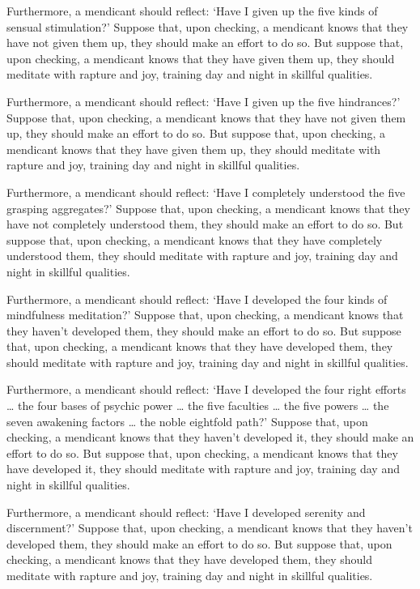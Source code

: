 \documentclass[12pt,openany]{book}%
\begin{document}
Furthermore, a mendicant should reflect: ‘Have I given up the five kinds of sensual stimulation?’ Suppose that, upon checking, a mendicant knows that they have not given them up, they should make an effort to do so. But suppose that, upon checking, a mendicant knows that they have given them up, they should meditate with rapture and joy, training day and night in skillful qualities. 

Furthermore, a mendicant should reflect: ‘Have I given up the five hindrances?’ Suppose that, upon checking, a mendicant knows that they have not given them up, they should make an effort to do so. But suppose that, upon checking, a mendicant knows that they have given them up, they should meditate with rapture and joy, training day and night in skillful qualities. 

Furthermore, a mendicant should reflect: ‘Have I completely understood the five grasping aggregates?’ Suppose that, upon checking, a mendicant knows that they have not completely understood them, they should make an effort to do so. But suppose that, upon checking, a mendicant knows that they have completely understood them, they should meditate with rapture and joy, training day and night in skillful qualities. 

Furthermore, a mendicant should reflect: ‘Have I developed the four kinds of mindfulness meditation?’ Suppose that, upon checking, a mendicant knows that they haven’t developed them, they should make an effort to do so. But suppose that, upon checking, a mendicant knows that they have developed them, they should meditate with rapture and joy, training day and night in skillful qualities. 

Furthermore, a mendicant should reflect: ‘Have I developed the four right efforts … the four bases of psychic power … the five faculties … the five powers … the seven awakening factors … the noble eightfold path?’ Suppose that, upon checking, a mendicant knows that they haven’t developed it, they should make an effort to do so. But suppose that, upon checking, a mendicant knows that they have developed it, they should meditate with rapture and joy, training day and night in skillful qualities. 

Furthermore, a mendicant should reflect: ‘Have I developed serenity and discernment?’ Suppose that, upon checking, a mendicant knows that they haven’t developed them, they should make an effort to do so. But suppose that, upon checking, a mendicant knows that they have developed them, they should meditate with rapture and joy, training day and night in skillful qualities. 
\end{document}
